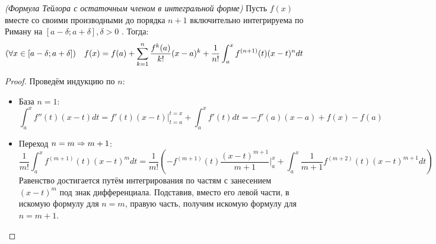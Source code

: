 \begin{theorem} \textit{(Формула Тейлора с остаточным членом в интегральной форме)}
	Пусть $f(x)$ вместе со своими производными до порядка $n + 1$ включительно интегрируема по Риману на  $[a-\delta;a+\delta], \delta>0$ .
	Тогда:
	\[
		(\forall x \in [a-\delta;a+\delta]) \quad f(x) = f(a) + \sum\limits_{k = 1}^n\frac{f^k(a)}{k!}(x - a)^k + \frac{1}{n!}\int_a^xf^{(n + 1)}(t)(x - t)^ndt
	\]
\end{theorem}

\begin{proof} Проведём индукцию по $n$:
	\begin{itemize}
		\item База $n = 1$:
		\[
			\int_a^x f''(t)(x - t)dt = f'(t)(x - t) \Bigg |_{t = a}^{t = x} + \int_a^x f'(t)dt = - f'(a)(x - a) + f(x) - f(a)
		\]
		
		\item Переход $n = m \Rightarrow m + 1$:
		\[
			\frac{1}{m!}\int_a^x f^{(m + 1)}(t)(x - t)^m dt = \frac{1}{m!}\left(-f^{(m + 1)}(t)\frac{(x - t)^{m + 1}}{m + 1} \Bigg|_a^x + \int_a^x \frac{1}{m + 1} f^{(m + 2)}(t)(x - t)^{m + 1} dt\right)
		\]
		Равенство достигается путём интегрирования по частям с занесением $(x - t)^m$ под знак дифференциала.
		Подставив, вместо его левой части, в искомую формулу для $n=m$, правую часть, получим искомую формулу для $n=m+1$.	\end{itemize}
\end{proof}
